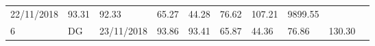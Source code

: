 \documentclass[
  11pt,
]{article}
\begin{document}
\begin{longtable}[]{@{}llllllllll@{}}
\begin{minipage}[t]{0.10\columnwidth}
22/11/2018\strut
\end{minipage} & \begin{minipage}[t]{0.06\columnwidth}\raggedright
93.31\strut
\end{minipage} & \begin{minipage}[t]{0.06\columnwidth}\raggedright
92.33\strut
\end{minipage} & \begin{minipage}[t]{0.06\columnwidth}\raggedright
65.27\strut
\end{minipage} & \begin{minipage}[t]{0.06\columnwidth}\raggedright
44.28\strut
\end{minipage} & \begin{minipage}[t]{0.06\columnwidth}\raggedright
76.62\strut
\end{minipage} & \begin{minipage}[t]{0.13\columnwidth}\raggedright
107.21\strut
\end{minipage} & \begin{minipage}[t]{0.08\columnwidth}\raggedright
9899.55\strut
\end{minipage}\tabularnewline
\begin{minipage}[t]{0.04\columnwidth}\raggedright
6\strut
\end{minipage} & \begin{minipage}[t]{0.09\columnwidth}\raggedright
DG\strut
\end{minipage} & \begin{minipage}[t]{0.10\columnwidth}\raggedright
23/11/2018\strut
\end{minipage} & \begin{minipage}[t]{0.06\columnwidth}\raggedright
93.86\strut
\end{minipage} & \begin{minipage}[t]{0.06\columnwidth}\raggedright
93.41\strut
\end{minipage} & \begin{minipage}[t]{0.06\columnwidth}\raggedright
65.87\strut
\end{minipage} & \begin{minipage}[t]{0.06\columnwidth}\raggedright
44.36\strut
\end{minipage} & \begin{minipage}[t]{0.06\columnwidth}\raggedright
76.86\strut
\end{minipage} & \begin{minipage}[t]{0.13\columnwidth}\raggedright
130.30\strut
\end{minipage} & \begin{minipage}[t]{0.08\columnwidth}\raggedright

\end{minipage}
\end{longtable}
\end{document}
